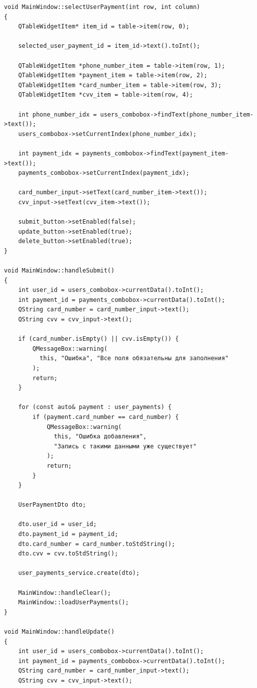 \documentclass[a4paper,14pt]{extarticle}
\begin{document}
\begin{Verbatim}[tabsize=4,fontsize=\small]
void MainWindow::selectUserPayment(int row, int column)
{
    QTableWidgetItem* item_id = table->item(row, 0);

    selected_user_payment_id = item_id->text().toInt();

    QTableWidgetItem *phone_number_item = table->item(row, 1);
    QTableWidgetItem *payment_item = table->item(row, 2);
    QTableWidgetItem *card_number_item = table->item(row, 3);
    QTableWidgetItem *cvv_item = table->item(row, 4);

    int phone_number_idx = users_combobox->findText(phone_number_item->text());
    users_combobox->setCurrentIndex(phone_number_idx);

    int payment_idx = payments_combobox->findText(payment_item->text());
    payments_combobox->setCurrentIndex(payment_idx);

    card_number_input->setText(card_number_item->text());
    cvv_input->setText(cvv_item->text());

    submit_button->setEnabled(false);
    update_button->setEnabled(true);
    delete_button->setEnabled(true);
}

void MainWindow::handleSubmit()
{
    int user_id = users_combobox->currentData().toInt();
    int payment_id = payments_combobox->currentData().toInt();
    QString card_number = card_number_input->text();
    QString cvv = cvv_input->text();

    if (card_number.isEmpty() || cvv.isEmpty()) {
        QMessageBox::warning(
          this, "Ошибка", "Все поля обязательны для заполнения"
        );
        return;
    }

    for (const auto& payment : user_payments) {
        if (payment.card_number == card_number) {
            QMessageBox::warning(
              this, "Ошибка добавления", 
              "Запись с такими данными уже существует"
            );
            return;
        }
    }

    UserPaymentDto dto;

    dto.user_id = user_id;
    dto.payment_id = payment_id;
    dto.card_number = card_number.toStdString();
    dto.cvv = cvv.toStdString();

    user_payments_service.create(dto);

    MainWindow::handleClear();
    MainWindow::loadUserPayments();
}

void MainWindow::handleUpdate()
{
    int user_id = users_combobox->currentData().toInt();
    int payment_id = payments_combobox->currentData().toInt();
    QString card_number = card_number_input->text();
    QString cvv = cvv_input->text();


\end{Verbatim}
\end{document}
